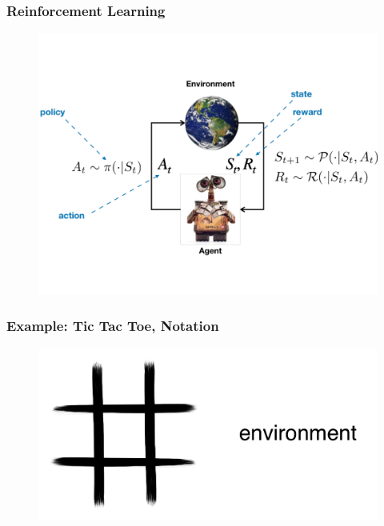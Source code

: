 \documentclass[handout]{beamer}
\begin{document}
\begin{frame}\frametitle{Reinforcement Learning}\small

\begin{figure}
\includegraphics[width=0.85\linewidth]{Figures/RL_agent}
\end{figure}

%
\end{frame}

\begin{frame}\frametitle{Example: Tic Tac Toe, Notation}\small
\vspace{4mm}
\begin{figure}
\includegraphics[width=0.75\linewidth]{Figures/tic1d}
\end{figure}
\vspace{5mm}
\end{frame}
\end{document}

